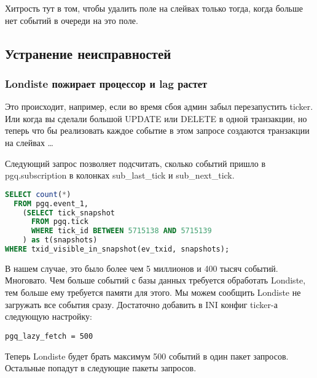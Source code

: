 Хитрость тут в том, чтобы удалить поле на слейвах только тогда, когда больше нет событий в очереди на это поле.


\subsection{Устранение неисправностей}

\subsubsection{Londiste пожирает процессор и lag растет}
Это происходит, например, если во время сбоя админ забыл перезапустить ticker. Или когда вы сделали большой
UPDATE или DELETE в одной транзакции, но теперь что бы реализовать каждое событие в этом запросе создаются
транзакции на слейвах \dots

Следующий запрос позволяет подсчитать, сколько событий пришло в pgq.subscription в колонках sub\_last\_tick и sub\_next\_tick.
\begin{lstlisting}[language=SQL,label=lst:londiste24,caption=Устранение неисправностей]
SELECT count(*)
  FROM pgq.event_1,
    (SELECT tick_snapshot
      FROM pgq.tick
      WHERE tick_id BETWEEN 5715138 AND 5715139
    ) as t(snapshots)
WHERE txid_visible_in_snapshot(ev_txid, snapshots);
\end{lstlisting}

В нашем случае, это было более чем 5 миллионов и 400 тысяч событий. Многовато. Чем больше событий
с базы данных требуется обработать Londiste, тем больше ему требуется памяти для этого. Мы можем сообщить
Londiste не загружать все события сразу. Достаточно добавить в INI конфиг ticker-а следующую настройку:
\begin{lstlisting}[label=lst:londiste25,caption=Устранение неисправностей]
pgq_lazy_fetch = 500
\end{lstlisting}

Теперь Londiste будет брать максимум 500 событий в один пакет запросов. Остальные попадут в следующие пакеты запросов.